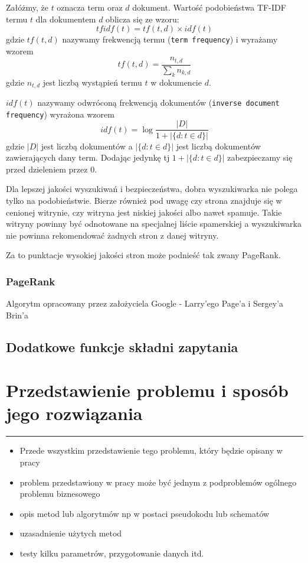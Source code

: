 \documentclass[licencjacka]{pracadypl}
\theoremstyle{definition}
\newcommand{\linia}{\rule{\linewidth}{0.4mm}}
\begin{document}
Załóżmy, że $t$ oznacza term oraz $d$ dokument.
Wartość podobieństwa TF-IDF termu $t$ dla dokumentem $d$ oblicza się ze wzoru:
\[
	tfidf(t) = tf(t,d) \times idf(t)
\]
gdzie $tf(t,d)$ nazywamy frekwencją termu (\texttt{term frequency}) i wyrażamy wzorem
\[
	tf(t,d) = 
	\frac{n_{t,d}}{\sum_{k} n_{k,d}}
\]
gdzie $n_{t,d}$ jest liczbą wystąpień termu $t$ w dokumencie $d$.

$idf(t)$ nazywamy odwróconą frekwencją dokumentów (\texttt{inverse document frequency}) wyrażona wzorem
\[
	idf(t) = \log 
	\frac 
	{ |D| }
	{ 1 + |\{ d \colon t \in d \}| }
\]
gdzie $|D|$ jest liczbą dokumentów a $|\{ d \colon t \in d \}|$ jest liczbą dokumentów zawierających dany term. Dodając jedynkę tj $1 + |\{ d \colon t \in d \}|$ zabezpieczamy się przed dzieleniem przez $0$. 


Dla lepszej jakości wyszukiwań i bezpieczeństwa,  dobra wyszukiwarka nie polega tylko na podobieństwie.
Bierze również pod uwagę czy strona znajduje się w cenionej witrynie, czy witryna jest niskiej jakości albo nawet spamuje. Takie witryny powinny być odnotowane na specjalnej liście spamerskiej a wyszukiwarka nie powinna rekomendować żadnych stron z danej witryny.

Za to punktacje wysokiej jakości stron może podnieść tak zwany PageRank.

\subsection{PageRank}
Algorytm opracowany przez założyciela Google - Larry'ego Page'a i Sergey'a Brin'a \cite{google-how-search-works}

\section{Dodatkowe funkcje składni zapytania}

\chapter{Przedstawienie problemu i sposób jego rozwiązania}
\linia
\begin{itemize}
	\item Przede wszystkim przedstawienie tego problemu, który będzie opisany w pracy
	\item problem przedstawiony w pracy może być jednym z podproblemów ogólnego problemu biznesowego
	\item opis metod lub algorytmów np w postaci pseudokodu lub schematów 
	\item uzasadnienie użytych metod
	\item testy kilku parametrów, przygotowanie danych itd.
\end{itemize}
\end{document}

